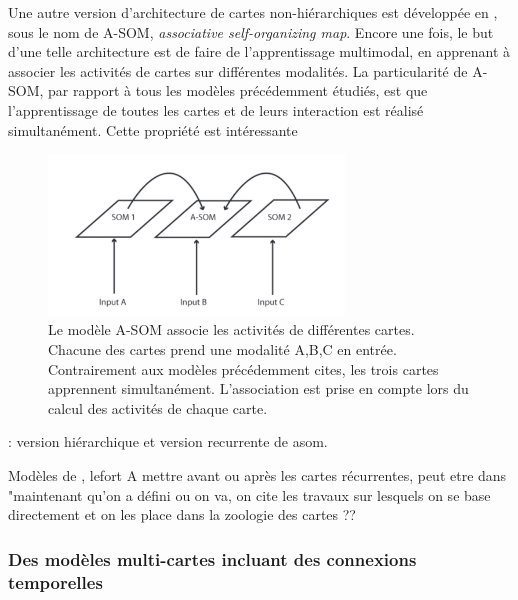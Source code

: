 \documentclass[../main]{subfiles}
\begin{document}
Une autre version d'architecture de cartes non-hiérarchiques est développée en \cite{johnsson_associating_2008}, sous le nom de A-SOM, \emph{associative self-organizing map}. Encore une fois, le but d'une telle architecture est de faire de l'apprentissage multimodal, en apprenant à associer les activités de cartes sur différentes modalités.
La particularité de A-SOM, par rapport à tous les modèles précédemment étudiés, est que l'apprentissage de toutes les cartes et de leurs interaction est réalisé simultanément. 
Cette propriété est intéressante
\begin{figure}
    \centering\includegraphics[width=0.7\textwidth]{A-SOM.pdf}
    \caption{Le modèle A-SOM \cite{johnsson_associating_2008} associe les activités de différentes cartes. Chacune des cartes prend une modalité A,B,C en entrée. Contrairement aux modèles précédemment cites, les trois cartes apprennent simultanément. L'association est prise en compte lors du calcul des activités de chaque carte.\label{fig:asom}}
\end{figure}
\cite{buonamente_hierarchies_2016,Buonamente2013SimulatingAW}: version hiérarchique et version recurrente de asom.



Modèles de \cite{khouzam,menard05}, lefort
A mettre avant ou après les cartes récurrentes, peut etre dans "maintenant qu'on a défini ou on va, on cite les travaux sur lesquels on se base directement et on les place dans la zoologie des cartes ??

\subsubsection{Des modèles multi-cartes incluant des connexions temporelles}
\end{document}

